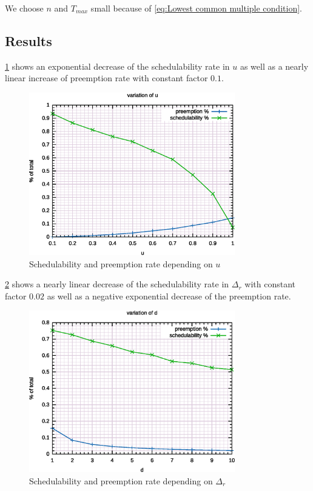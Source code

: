 \documentclass[a4paper,12pt]{article}
\begin{document}
We choose $n$ and $T_{max}$ small because of \ref{eq:Lowest common multiple condition}.


\subsection{Results}



\ref{fig:stu:au} shows an exponential decrease of the schedulability rate in $u$ as well as a nearly linear increase of preemption rate with constant factor $0.1$.

\begin{figure}
	\centering
	\includegraphics[width=0.8\textwidth]{../gnuplot/eps/1}
	\caption{\label{fig:stu:au} Schedulability and preemption rate depending on $u$}
\end{figure}


\ref{fig:stu:ad} shows a nearly linear decrease of the schedulability rate in $\Delta_r$ with constant factor $0.02$ as well as a negative exponential decrease of the preemption rate.

\begin{figure}
	\centering
	\includegraphics[width=0.8\textwidth]{../gnuplot/eps/2}
	\caption{\label{fig:stu:ad} Schedulability and preemption rate depending on $\Delta_r$}
\end{figure}
\end{document}
